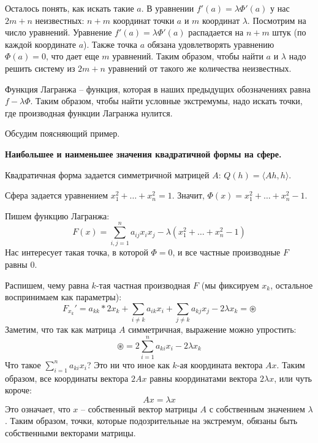 \vspace*{5mm}

Осталось понять, как искать такие $a$.
В уравнении $f'(a) = \lambda \Phi'(a)$ у нас $2m + n$ неизвестных: $n + m$ координат точки $a$ и $m$ координат $\lambda$.
Посмотрим на число уравнений. 
Уравнение $f'(a) = \lambda \Phi'(a)$ распадается на $n + m$ штук (по каждой координате $a$).
Также точка $a$ обязана удовлетворять уравнению $\Phi(a) = 0$, что дает еще $m$ уравнений.
Таким образом, чтобы найти $a$ и $\lambda$ надо решить систему из $2m + n$ уравнений от такого же количества неизвестных. 
 
\vspace*{5mm}

\begin{conj}
    Функция Лагранжа -- функция, которая в наших предыдущих обозначениях равна $f - \lambda \Phi$.
    Таким образом, чтобы найти условные экстремумы, надо искать точки, где производная функции Лагранжа нулится.
\end{conj}

\vspace*{5mm}

Обсудим поясняющий пример.

\textbf{Наибольшее и наименьшее значения квадратичной формы на сфере.}

    Квадратичная форма задается симметричной матрицей $A$: $Q(h) = \langle Ah, h \rangle$.

    Сфера задается уравнением $x_1^2 + \dots + x_n^2 = 1$.
    Значит, $\Phi(x) = x_1^2 + \dots + x_n^2 - 1$.

    Пишем функцию Лагранжа: \[ F(x) = \sum_{i, j = 1}^n a_{ij}x_ix_j - \lambda(x_1^2 + \dots + x_n^2 - 1) \]
    Нас интересует такая точка, в которой $\Phi = 0$, и все частные производные $F$ равны 0.

    Распишем, чему равна $k$-тая частная производная $F$ (мы фиксируем $x_k$, остальное воспринимаем как параметры): \[ F_{x_k}' = a_{kk}*2x_k + \sum_{i\neq k} a_{ik}x_i + \sum_{j \neq k} a_{kj}x_j -2\lambda x_k = \circledast \]
    Заметим, что так как матрица $A$ симметричная, выражение можно упростить: \[ \circledast = 2\sum_{i = 1}^n a_{ki}x_i - 2\lambda x_k \]
    Что такое $\sum\limits_{i = 1}^n a_{ki}x_i$? 
    Это ни что иное как $k$-ая координата вектора $Ax$. 
    Таким образом, все координаты вектора $2Ax$ равны координатами вектора $2\lambda x$, или чуть короче: \[ Ax = \lambda x \]
    Это означает, что $x$ -- собственный вектор матрицы $A$ с собственным значением $\lambda$.
    Таким образом, точки, которые подозрительные на экстремум, обязаны быть собственными векторами матрицы.
    
